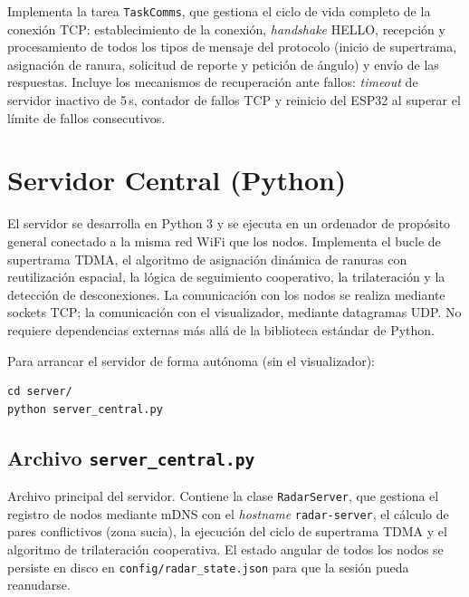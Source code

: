 Implementa la tarea \texttt{TaskComms}, que gestiona el ciclo de vida completo de la
conexión TCP: establecimiento de la conexión, \textit{handshake} HELLO, recepción y
procesamiento de todos los tipos de mensaje del protocolo (inicio de supertrama, asignación
de ranura, solicitud de reporte y petición de ángulo) y envío de las respuestas. Incluye
los mecanismos de recuperación ante fallos: \textit{timeout} de servidor inactivo de 5\,s,
contador de fallos TCP y reinicio del ESP32 al superar el límite de fallos consecutivos.



\section{Servidor Central (Python)}

El servidor se desarrolla en Python 3 y se ejecuta en un ordenador de propósito general
conectado a la misma red WiFi que los nodos. Implementa el bucle de supertrama TDMA, el
algoritmo de asignación dinámica de ranuras con reutilización espacial, la lógica de
seguimiento cooperativo, la trilateración y la detección de desconexiones. La comunicación
con los nodos se realiza mediante sockets TCP; la comunicación con el visualizador, mediante
datagramas UDP. No requiere dependencias externas más allá de la biblioteca estándar de Python.

Para arrancar el servidor de forma autónoma (sin el visualizador):

\begin{lstlisting}[style=Consola]
cd server/
python server_central.py
\end{lstlisting}

\subsection{Archivo \texttt{server\_central.py}}

Archivo principal del servidor. Contiene la clase \texttt{RadarServer}, que gestiona el
registro de nodos mediante mDNS con el \textit{hostname} \texttt{radar-server}, el cálculo
de pares conflictivos (zona sucia), la ejecución del ciclo de supertrama TDMA y el algoritmo
de trilateración cooperativa. El estado angular de todos los nodos se persiste en disco en
\texttt{config/radar\_state.json} para que la sesión pueda reanudarse.

